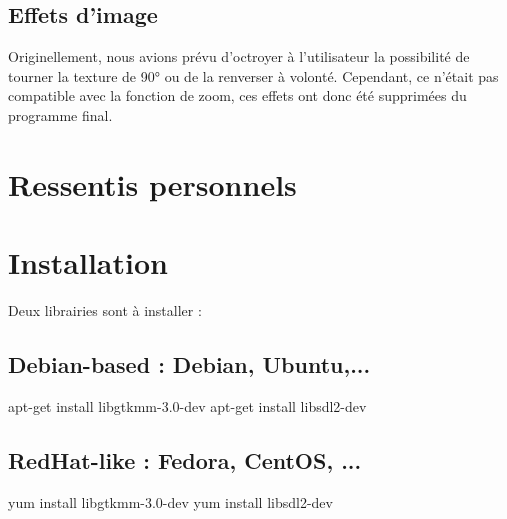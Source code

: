 \documentclass{article}
\begin{document}
	\subsection{Effets d'image}

	Originellement, nous avions prévu d'octroyer à l'utilisateur la possibilité de tourner la texture de 90° ou de la renverser à volonté.
    Cependant, ce n'était pas compatible avec la fonction de zoom, ces effets ont donc été supprimées du programme final.

    \section{Ressentis personnels}

	\section{Installation}
	Deux librairies sont à installer :
	\subsection* {Debian-based : Debian, Ubuntu,...}
		apt-get install libgtkmm-3.0-dev
		apt-get install libsdl2-dev
	\subsection* {RedHat-like : Fedora, CentOS, ...}
		yum install libgtkmm-3.0-dev
		yum install libsdl2-dev
\end{document}
